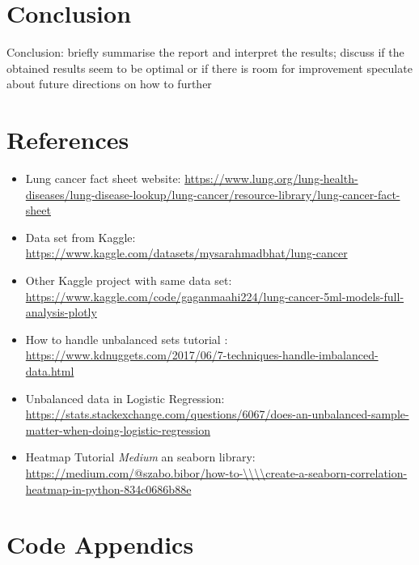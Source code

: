 \documentclass[a4paper,12pt]{article}
\begin{document}
\section{Conclusion}
\label{sec:org4d20b13}
Conclusion:
briefly summarise the report and interpret the results;
 discuss if the obtained results seem to be optimal or if there is room for improvement
speculate about future directions on how to further



\section{References}
\label{sec:org3dd935a}
\begin{itemize}
\item\relax [1] Lung cancer fact sheet website:  \url{https://www.lung.org/lung-health-diseases/lung-disease-lookup/lung-cancer/resource-library/lung-cancer-fact-sheet}
\end{itemize}






\begin{itemize}
\item\relax [1] Data set from Kaggle: \url{https://www.kaggle.com/datasets/mysarahmadbhat/lung-cancer}

\item\relax [2] Other Kaggle project with same data set: \url{https://www.kaggle.com/code/gaganmaahi224/lung-cancer-5ml-models-full-analysis-plotly}

\item\relax [3] How to handle unbalanced sets tutorial :
\url{https://www.kdnuggets.com/2017/06/7-techniques-handle-imbalanced-data.html}

\item\relax [4] Unbalanced data in Logistic Regression: \url{https://stats.stackexchange.com/questions/6067/does-an-unbalanced-sample-matter-when-doing-logistic-regression}

\item\relax [5] Heatmap Tutorial \emph{Medium} an seaborn library: \url{https://medium.com/@szabo.bibor/how-to-\\\\create-a-seaborn-correlation-heatmap-in-python-834c0686b88e}
\end{itemize}


\section{Code Appendics}
\label{sec:org4fb7dec}
\end{document}
